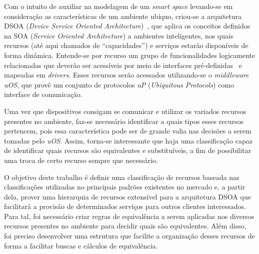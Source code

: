 Com o intuito de auxiliar na modelagem de um \emph{smart space} levando-se em consideração as características de um ambiente ubíquo, criou-se a arquitetura DSOA (\emph{Device Service Oriented Architecture})~\cite{buzetoDSOA2010}, que aplica os conceitos definidos na SOA (\emph{Service Oriented Architecture}) a ambientes inteligentes, nos quais recursos (até aqui chamados de ``capacidades'') e serviços estarão disponíveis de forma dinâmica. Entende-se por recurso um grupo de funcionalidades logicamente relacionadas que deverão ser acessíveis por meio de interfaces pré-definidas~\cite{buzeto2010} e mapeadas em \emph{drivers}. Esses recursos serão acessados utilizando-se o \emph{middleware} \emph{uOS}, que provê um conjunto de protocolos \emph{uP} (\emph{Ubiquitous Protocols}) como interface de comunicação.

Uma vez que dispositivos consigam se comunicar e utilizar os variados recursos presentes no ambiente, faz-se necessário identificar a quais tipos esses recursos pertencem, pois essa característica pode ser de grande valia nas decisões a serem tomadas pelo \emph{uOS}. Assim, torna-se interessante que haja uma classificação capaz de identificar quais recursos são equivalentes e substituíveis, a fim de possibilitar uma troca de certo recurso sempre que necessário.

O objetivo deste trabalho é definir uma classificação de recursos baseada nas classificações utilizadas no principais padrões existentes no mercado e, a partir dela, prover uma hierarquia de recursos extensível para a arquitetura DSOA que facilitará a provisão de determinados serviços para outros clientes interessados. Para tal, foi necessário criar regras de equivalência a serem aplicadas nos diversos recursos presentes no ambiente para decidir quais são equivalentes. Além disso, foi preciso desenvolver uma estrutura que facilite a organização desses recursos de forma a facilitar buscas e cálculos de equivalência.

